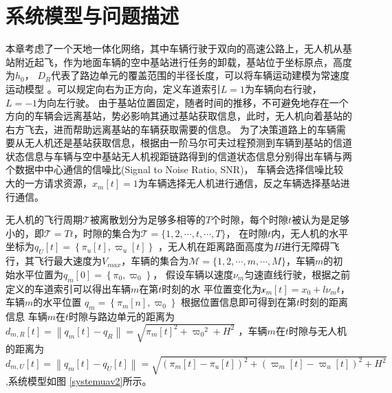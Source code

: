 \section{系统模型与问题描述}\label{section4-2}
本章考虑了一个天地一体化网络，其中车辆行驶于双向的高速公路上，无人机从基站附近起飞，作为地面车辆的空中基站进行任务的卸载，基站位于坐标原点，高度为$h_0$，
$D_R$代表了路边单元的覆盖范围的半径长度，可以将车辆运动建模为常速度运动模型 \supercite{COIFMAN1998271}。可以规定向右为正方向，定义车道索引$L=1$为车辆向右行驶，$L=-1$为向左行驶。  %
由于基站位置固定，随者时间的推移，不可避免地存在一个方向的车辆会远离基站，势必影响其通过基站获取信息，此时，无人机向着基站的右方飞去，进而帮助远离基站的车辆获取需要的信息。
为了决策道路上的车辆需要从无人机还是基站获取信息，根据由一阶马尔可夫过程预测到车辆到基站的信道状态信息与车辆与空中基站无人机视距链路得到的信道状态信息分别得出车辆与两个数据中中心通信的信噪比(Signal to Noise Ratio, SNR)，
车辆会选择信噪比较大的一方请求资源，$x_m\left[t\right]=1$为车辆选择无人机进行通信，反之车辆选择基站进行通信。

无人机的飞行周期$\mathcal{T}$被离散划分为足够多相等的$T $个时隙，每个时隙$t$被认为是足够小的，即$\mathcal{T}=Tt $，时隙的集合为$\mathcal{T}=\{1,2,\cdots ,t,\cdots ,T\}$，
在时隙$t$内，无人机的水平坐标为$q_U\left[t\right]=\left\{\pi_u\left[t\right],\varpi_u\left[t\right]\right\}$
，无人机在距离路面高度为$H$进行无障碍飞行，其飞行最大速度为$V_{max}$，车辆的集合为$\mathcal{M}=\{1,2,\cdots ,m,\cdots ,M\}$，车辆$m$的初始水平位置为$q_m\left[0\right]=\left\{\pi_0,\varpi_0\right\}$，
假设车辆以速度$\nu_m$匀速直线行驶，根据之前定义的车道索引可以得出车辆$m$在第$t$时刻的水
平位置变化为$\mathcal{x}_m\left[t\right]=x_0+l\nu_m t$，车辆$m$的水平位置 $q_m=\left\{\pi_m\left[n\right],\varpi_0\right\}$
根据位置信息即可得到在第$t$时刻的距离信息
车辆$m$在$t$时隙与路边单元的距离为${{d}_{m,R}}\left[ t \right]=\left\| {{q}_{m}}\left[ t \right]-{{q}_{R}} \right\|=\sqrt{{{\pi}_{m}}{{\left[ t \right]}^{2}}+{{\varpi}_{0}}^{2}+{{H}^{2}}}$
，车辆$m$在$t$时隙与无人机的距离为
$
{{d}_{m,U}}\left[ t \right]=\left\| {{q}_{m}}\left[ t \right]-{{q}_{U}}\left[ t \right] \right\|=\sqrt{{{\left( {{\pi}_{m}}\left[ t \right]-{{\pi}_{u}}\left[ t \right] \right)}^{2}}+{{\left( {{\varpi}_{m}}\left[ t \right]-{{\varpi}_{u}}\left[ t \right] \right)}^{2}}+{{H}^{2}}}\
$,系统模型如图 \ref{systemuav2}所示。%

